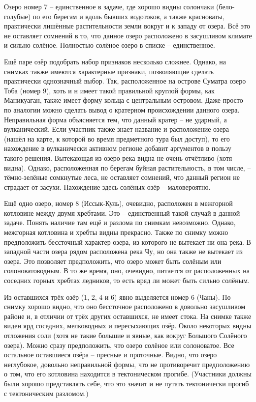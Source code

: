 Озеро номер 7 – единственное в задаче, где хорошо видны солончаки (бело-голубые) по его берегам и вдоль бывших водотоков, а также красноваты, практически лишённые растительности земли вокруг и к западу от озера. Всё это не оставляет сомнений в то, что данное озеро расположено в засушливом климате и сильно солёное. Полностью солёное озеро в списке – единственное.

Ещё паре озёр подобрать набор признаков несколько сложнее. Однако, на снимках также имеются характерные признаки, позволяющие сделать практически однозначный выбор. Так, расположенное на острове Суматра озеро Тоба (номер  9), хоть и н имеет такой правильной круглой формы, как Маникуаган, также имеет форму кольца с центральным островом. Даже просто по аналогии можно сделать вывод о кратерном происхождении данного озера. Неправильная форма объясняется тем, что данный кратер – не ударный, а вулканический. Если участник также знает название и расположение озера (нашёл на карте, к которой во время предметного тура был доступ), то его нахождение в вулканически активном регионе добавит аргументов в пользу такого решения. Вытекающая из озеро река видна не очень отчётливо (хотя видна). Однако, расположенная по берегам буйная растительность, в том числе, – тёмно-зелёные сомкнутые леса, не оставляет сомнений, что данный регион не страдает от засухи. Нахождение здесь солёных озёр – маловероятно.

Ещё одно озеро, номер 8 (Иссык-Куль), очевидно, расположен в межгорной котловине между двумя хребтами. Это – единственный такой случай в данной задаче. Понять наличие там ещё и разлома по снимкам невозможно. Однако, межгорная котловина и хребты видны прекрасно. Также по снимку можно предположить бессточный характер озера, из которого не вытекает ни она река. В западной части озера рядом расположена река Чу, но она также не вытекает из озера. Это позволяет предположить, что озеро может быть солёным или солоноватоводным. В то же время, оно, очевидно, питается от расположенных на соседних горных хребтах ледников, то есть вряд ли может быть сильно солёным.

Из оставшихся трёх озёр (1, 2, 4 и 6) явно выделяется номер 6 (Чаны). По снимку хорошо видно, что оно бессточное расположено в довольно засушливом районе и, в отличии от трёх других оставшихся, не имеет стока. На снимке также виден ярд соседних, мелководных и пересыхающих озёр. Около некоторых видны отложения соли (хотя не такие большие и явные, как вокруг Большого Солёного озера). Можно сразу предположить, что озеро солёное или солоноватое. Все остальное оставшиеся озёра – пресные и проточные. Видно, что озеро неглубокое, довольно неправильной формы, что не противоречит предположению о том, что его котловина находится в тектоническом прогибе. (Участники должны были хорошо представлять себе, что это значит и не путать тектонически прогиб с тектоническим разломом.)

